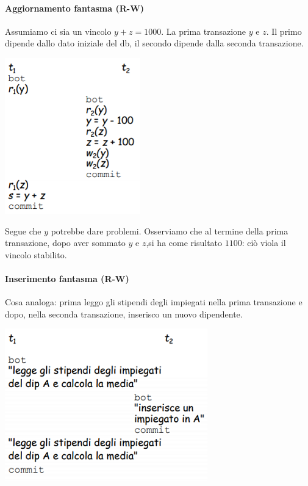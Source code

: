\paragraph{Aggiornamento fantasma (R-W)} Assumiamo ci sia un vincolo $y+z=1000$. La prima transazione $y$ e $z$. Il primo dipende dallo dato iniziale del db, il secondo dipende dalla seconda transazione. 
\begin{center}
	\includegraphics{images/156.PNG}
\end{center}
Segue che $y$ potrebbe dare problemi. Osserviamo che al termine della prima transazione, dopo aver sommato $y$ e $z$,si ha come risultato $1100$: ciò viola il vincolo stabilito.

\paragraph{Inserimento fantasma (R-W)} Cosa analoga: prima leggo gli stipendi degli impiegati nella prima transazione e dopo, nella seconda transazione, inserisco un nuovo dipendente.
\begin{center}
	\includegraphics{images/157.PNG}
\end{center}

